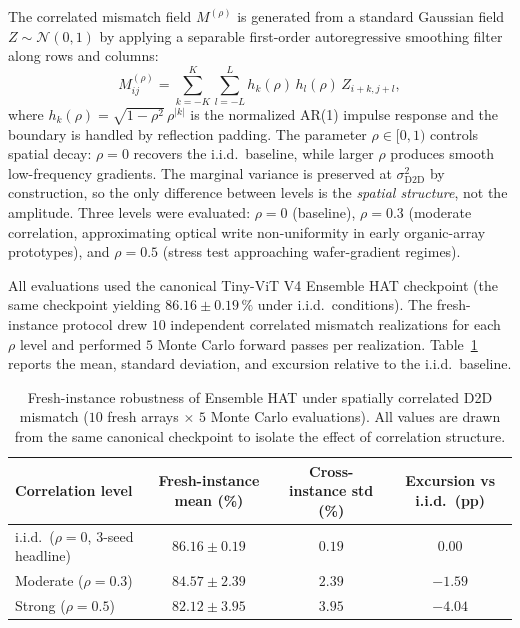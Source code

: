 The correlated mismatch field $M^{(\rho)}$ is generated from a standard Gaussian field $Z \sim \mathcal{N}(0,1)$ by applying a separable first-order autoregressive smoothing filter along rows and columns:
\begin{equation}
    M^{(\rho)}_{ij} = \sum_{k=-K}^{K} \sum_{l=-L}^{L} h_{k}(\rho)\, h_{l}(\rho)\, Z_{i+k,j+l},
    \label{eq:ar1-separable}
\end{equation}
where $h_{k}(\rho) = \sqrt{1-\rho^{2}}\, \rho^{|k|}$ is the normalized AR(1) impulse response and the boundary is handled by reflection padding.  The parameter $\rho \in [0,1)$ controls spatial decay: $\rho=0$ recovers the i.i.d.~baseline, while larger $\rho$ produces smooth low-frequency gradients.  The marginal variance is preserved at $\sigma^{2}_{\text{D2D}}$ by construction, so the only difference between levels is the \emph{spatial structure}, not the amplitude.  Three levels were evaluated: $\rho=0$ (baseline), $\rho=0.3$ (moderate correlation, approximating optical write non-uniformity in early organic-array prototypes), and $\rho=0.5$ (stress test approaching wafer-gradient regimes).

All evaluations used the canonical Tiny-ViT V4 Ensemble HAT checkpoint (the same checkpoint yielding $86.16\pm0.19\,\%$ under i.i.d.~conditions).  The fresh-instance protocol drew $10$ independent correlated mismatch realizations for each $\rho$ level and performed $5$ Monte Carlo forward passes per realization.  Table~\ref{tab:correlated-d2d-full} reports the mean, standard deviation, and excursion relative to the i.i.d.~baseline.

\begin{table}[ht]
    \centering
    \caption{Fresh-instance robustness of Ensemble HAT under spatially correlated D2D mismatch ($10$ fresh arrays $\times$ $5$ Monte Carlo evaluations).  All values are drawn from the same canonical checkpoint to isolate the effect of correlation structure.}
    \label{tab:correlated-d2d-full}
    \small
    \setlength{\tabcolsep}{4pt}
    \begin{tabularx}{\textwidth}{@{}>{\raggedright\arraybackslash}Xccc@{}}
        \toprule
        Correlation level & Fresh-instance mean (\%) & Cross-instance std (\%) & Excursion vs i.i.d.~(pp) \\
        \midrule
        i.i.d.~($\rho=0$, 3-seed headline)   & $86.16\pm0.19$ & $0.19$ & $0.00$ \\
        Moderate ($\rho=0.3$) & $84.57\pm2.39$ & $2.39$ & $-1.59$ \\
        Strong ($\rho=0.5$)   & $82.12\pm3.95$ & $3.95$ & $-4.04$ \\
        \bottomrule
    \end{tabularx}
\end{table}

